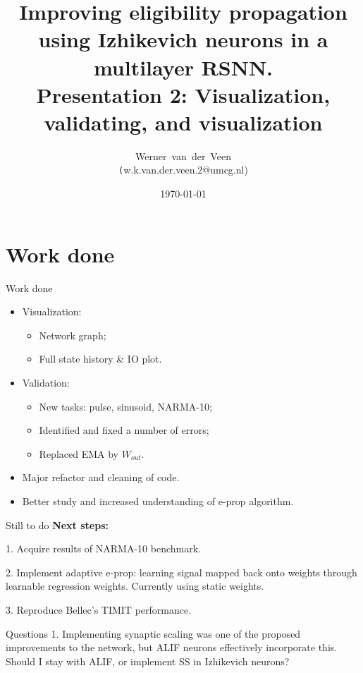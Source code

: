 \documentclass[t]{beamer}
\title[Eligibility propagation]{Improving eligibility propagation using Izhikevich neurons in a multilayer RSNN.\\\vspace{10pt}
\large{Presentation 2: Visualization, validating, and visualization}}
\author[Werner]{Werner~van~der~Veen\\\tiny\texttt({w.k.van.der.veen.2@umcg.nl})}\date{\today}
\begin{document}
\begin{frame}
    \titlepage
\end{frame}


\small
\section{Work done}

\begin{frame}{Work done}
	\begin{itemize}
		\item Visualization:
			\begin{itemize}
				\item Network graph;
				\item Full state history \& IO plot.
			\end{itemize}
		\item Validation:
			\begin{itemize}
				\item New tasks: pulse, sinusoid, NARMA-10;
				\item Identified and fixed a number of errors;
				\item Replaced EMA by $W_{out}$.
				
			\end{itemize}
		\item Major refactor and cleaning of code.
		\item Better study and increased understanding of e-prop algorithm.
	\end{itemize}
\end{frame}

\begin{frame}{Still to do}
    \textbf{Next steps:}
    
    1. Acquire results of NARMA-10 benchmark.
    
    2. Implement adaptive e-prop: learning signal mapped back onto weights through learnable regression weights. Currently using static weights.
    
    3. Reproduce Bellec's TIMIT performance.
\end{frame}

\begin{frame}{Questions}
    1. Implementing synaptic scaling was one of the proposed improvements to the network, but ALIF neurons effectively incorporate this. Should I stay with ALIF, or implement SS in Izhikevich neurons?
\end{frame}
\end{document}
